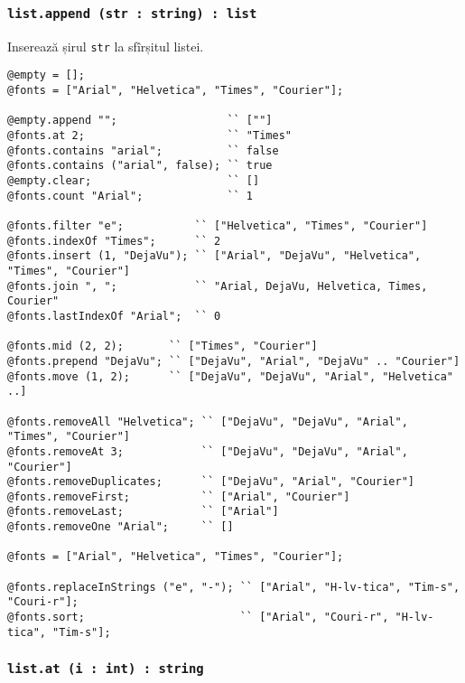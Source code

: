 \subsubsection{\texttt{list.append (str : string) : list}}

Inserează șirul \texttt{str} la sfîrșitul listei.

\newpage
\begin{sourcecode}
\label{listmethods}
\begin{verbatim}
@empty = [];
@fonts = ["Arial", "Helvetica", "Times", "Courier"];

@empty.append "";                 `` [""]
@fonts.at 2;                      `` "Times"
@fonts.contains "arial";          `` false
@fonts.contains ("arial", false); `` true
@empty.clear;                     `` []
@fonts.count "Arial";             `` 1

@fonts.filter "e";           `` ["Helvetica", "Times", "Courier"]
@fonts.indexOf "Times";      `` 2
@fonts.insert (1, "DejaVu"); `` ["Arial", "DejaVu", "Helvetica", "Times", "Courier"]
@fonts.join ", ";            `` "Arial, DejaVu, Helvetica, Times, Courier"
@fonts.lastIndexOf "Arial";  `` 0

@fonts.mid (2, 2);       `` ["Times", "Courier"]
@fonts.prepend "DejaVu"; `` ["DejaVu", "Arial", "DejaVu" .. "Courier"]
@fonts.move (1, 2);      `` ["DejaVu", "DejaVu", "Arial", "Helvetica" ..]

@fonts.removeAll "Helvetica"; `` ["DejaVu", "DejaVu", "Arial", "Times", "Courier"]
@fonts.removeAt 3;            `` ["DejaVu", "DejaVu", "Arial", "Courier"]
@fonts.removeDuplicates;      `` ["DejaVu", "Arial", "Courier"]
@fonts.removeFirst;           `` ["Arial", "Courier"]
@fonts.removeLast;            `` ["Arial"]
@fonts.removeOne "Arial";     `` []

@fonts = ["Arial", "Helvetica", "Times", "Courier"];

@fonts.replaceInStrings ("e", "-"); `` ["Arial", "H-lv-tica", "Tim-s", "Couri-r"];
@fonts.sort;                        `` ["Arial", "Couri-r", "H-lv-tica", "Tim-s"];
\end{verbatim}
\end{sourcecode}

\subsubsection{\texttt{list.at (i : int) : string}}

